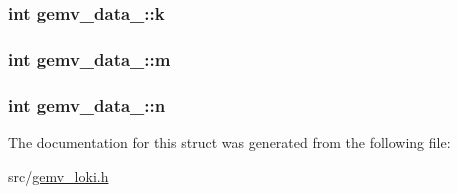 \subsubsection[{k}]{\setlength{\rightskip}{0pt plus 5cm}int gemv\+\_\+data\+\_\+\+::k}\hypertarget{structgemv__data___a5ed131658b3409ede30f2761512a2c4e}{}\label{structgemv__data___a5ed131658b3409ede30f2761512a2c4e}
\subsubsection[{m}]{\setlength{\rightskip}{0pt plus 5cm}int gemv\+\_\+data\+\_\+\+::m}\hypertarget{structgemv__data___a774cbf8dfdd303881fc83a7549797fb3}{}\label{structgemv__data___a774cbf8dfdd303881fc83a7549797fb3}
\subsubsection[{n}]{\setlength{\rightskip}{0pt plus 5cm}int gemv\+\_\+data\+\_\+\+::n}\hypertarget{structgemv__data___a165500db799a309ded6742589becdbd8}{}\label{structgemv__data___a165500db799a309ded6742589becdbd8}


The documentation for this struct was generated from the following file\+:\begin{DoxyCompactItemize}
\item 
src/\hyperlink{gemv__loki_8h}{gemv\+\_\+loki.\+h}\end{DoxyCompactItemize}
